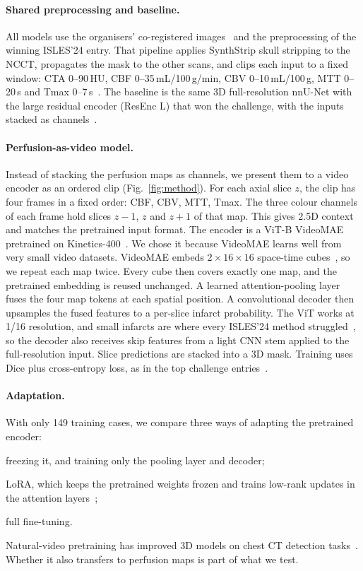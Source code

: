 \paragraph{Shared preprocessing and baseline.}
All models use the organisers' co-registered images~\cite{delarosa2024isles24} and the preprocessing of the winning ISLES'24 entry. That pipeline applies SynthStrip skull stripping to the NCCT, propagates the mask to the other scans, and clips each input to a fixed window: CTA 0--90\,HU, CBF 0--35\,mL/100\,g/min, CBV 0--10\,mL/100\,g, MTT 0--20\,s and Tmax 0--7\,s~\cite{ren2025isles24}. The baseline is the same 3D full-resolution nnU-Net with the large residual encoder (ResEnc L) that won the challenge, with the inputs stacked as channels~\cite{ren2025isles24,isensee2024revisited}.

\paragraph{Perfusion-as-video model.}
Instead of stacking the perfusion maps as channels, we present them to a video encoder as an ordered clip (Fig.~\ref{fig:method}). For each axial slice $z$, the clip has four frames in a fixed order: CBF, CBV, MTT, Tmax. The three colour channels of each frame hold slices $z{-}1$, $z$ and $z{+}1$ of that map. This gives 2.5D context and matches the pretrained input format. The encoder is a ViT-B VideoMAE pretrained on Kinetics-400~\cite{tong2022videomae}. We chose it because VideoMAE learns well from very small video datasets. VideoMAE embeds $2{\times}16{\times}16$ space-time cubes~\cite{tong2022videomae}, so we repeat each map twice. Every cube then covers exactly one map, and the pretrained embedding is reused unchanged. A learned attention-pooling layer fuses the four map tokens at each spatial position. A convolutional decoder then upsamples the fused features to a per-slice infarct probability. The ViT works at 1/16 resolution, and small infarcts are where every ISLES'24 method struggled~\cite{delarosa2024isles24}, so the decoder also receives skip features from a light CNN stem applied to the full-resolution input. Slice predictions are stacked into a 3D mask. Training uses Dice plus cross-entropy loss, as in the top challenge entries~\cite{delarosa2024isles24}.

\paragraph{Adaptation.}
With only 149 training cases, we compare three ways of adapting the pretrained encoder:
\begin{enumerate*}[label=(\roman*)]
  \item freezing it, and training only the pooling layer and decoder;
  \item LoRA, which keeps the pretrained weights frozen and trains low-rank updates in the attention layers~\cite{hu2022lora};
  \item full fine-tuning.
\end{enumerate*}
Natural-video pretraining has improved 3D models on chest CT detection tasks~\cite{ke2023videopretraining}. Whether it also transfers to perfusion maps is part of what we test.

